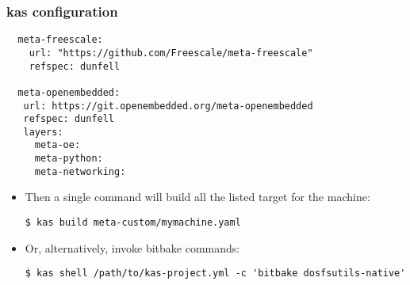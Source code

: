 \begin{frame}[fragile]
  \frametitle{kas configuration}
  \fontsize{9}{9}\selectfont
  \begin{block}{}
  \begin{verbatim}
  meta-freescale:
    url: "https://github.com/Freescale/meta-freescale"
    refspec: dunfell

  meta-openembedded:
   url: https://git.openembedded.org/meta-openembedded
   refspec: dunfell
   layers:
     meta-oe:
     meta-python:
     meta-networking:
  \end{verbatim}
  \end{block}


  \begin{itemize}
  \item Then a single command will build all the listed target for the
machine:

  \begin{verbatim}
$ kas build meta-custom/mymachine.yaml
  \end{verbatim}

  \item Or, alternatively, invoke bitbake commands:

  \begin{verbatim}
$ kas shell /path/to/kas-project.yml -c 'bitbake dosfsutils-native'
  \end{verbatim}
  \end{itemize}
\end{frame}

